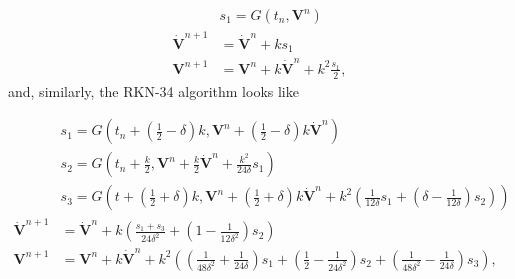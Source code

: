 \begin{equation*}
\begin{split}
    &s_1 = G(t_n,\boldsymbol{V}^n) \\
    \dot{\boldsymbol{V}}^{n+1} &= \dot{\boldsymbol{V}}^n + k s_1 \\
    \boldsymbol{V}^{n+1} &= \boldsymbol{V}^n + k\dot{\boldsymbol{V}}^n + k^2 \frac{s_1}{2},
\end{split}
\end{equation*}
and, similarly, the RKN-34 algorithm looks like

\begin{equation*}
    \begin{split}
        &s_1 = G\left(t_n+(\frac{1}{2}-\delta)k,\boldsymbol{V}^n+(\frac{1}{2}-\delta)k\dot{\boldsymbol{V}}^n\right)\\
        &s_2 = G\left(t_n+\frac{k}{2},\boldsymbol{V}^n+\frac{k}{2} \dot{\boldsymbol{V}}^n + \frac{k^2}{24\delta} s_1\right)\\
        &s_3 = G\left(t+(\frac{1}{2}+\delta)k, \boldsymbol{V}^n+(\frac{1}{2}+\delta)k\dot{\boldsymbol{V}}^n + k^2(\frac{1}{12\delta}s_1 + (\delta-\frac{1}{12\delta})s_2)\right)\\
        \dot{\boldsymbol{V}}^{n+1} &= \dot{\boldsymbol{V}}^n + k\left(\frac{s_1+s_3}{24\delta^2} + (1-\frac{1}{12\delta^2})s_2\right) \\
        \boldsymbol{V}^{n+1} &= \boldsymbol{V}^{n} + k\dot{\boldsymbol{V}}^n + k^2\left( (\frac{1}{48\delta^2}+\frac{1}{24\delta})s_1+ (\frac{1}{2}-\frac{1}{24\delta^2})s_2 + (\frac{1}{48\delta^2}-\frac{1}{24\delta})s_3\right),
    \end{split}
\end{equation*}


